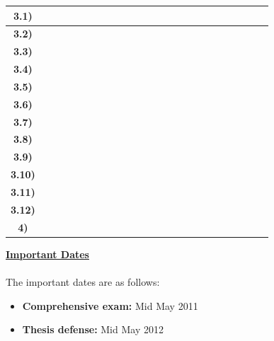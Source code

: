 \documentclass[a4,12pt]{report}
\newcommand{\X}{\cellcolor[gray]{0.5}}
\newcommand{\x}{\cellcolor[gray]{0.8}}
\begin{document}
\begin{table}[bt]
{\begin{tabular}{|c|c||c|c||c|c||c||c|c|c|c||c|c|c|c||c|}
\textbf{3.1)} & \X & ~ & ~ & ~ & ~ & ~ & ~ & ~ & ~ & ~ & ~ & ~ & ~ & ~ & \\ \hline
\textbf{3.2)} & \x & ~ & ~ & ~ & \X & ~ & ~ & ~ & ~ & ~ & ~ & ~ & ~ & ~ & \\ \hline
\textbf{3.3)} & \x & ~ & ~ & ~ & \X & ~ & ~ & ~ & ~ & ~ & ~ & ~ & ~ & ~ & \\ \hline
\textbf{3.4)} & \X & ~ & ~ & ~ & ~ & ~ & ~ & ~ & ~ & ~ & ~ & ~ & ~ & ~ & \\ \hline
\textbf{3.5)} & ~ & ~ & ~ & \X & \X & ~ & ~ & ~ & ~ & ~ & ~ & ~ & ~ & ~ & \\ \hline
\textbf{3.6)} & ~ & ~ & ~ & \X & \X & ~ & ~ & ~ & ~ & ~ & ~ & ~ & ~ & ~ & \\ \hline
\textbf{3.7)} & ~ & ~ & ~ & ~ & ~ & \X & \X & \X & ~ & ~ & ~ & ~ & ~ & ~ & \\ \hline
\textbf{3.8)} & ~ & ~ & ~ & ~ & ~ & ~ & ~ & \X & ~ & ~ & ~ & ~ & ~ & ~ & \\ \hline
\textbf{3.9)} & ~ & ~ & ~ & ~ & ~ & ~ & ~ & ~ & \X & \X & \X & ~ & ~ & ~ & \X \\ \hline
\textbf{3.10)} & ~ & ~ & ~ & ~ & ~ & ~ & ~ & ~ & ~ & ~ & \X & \X & ~ & ~ & \X \\ \hline
\textbf{3.11)} & ~ & ~ & ~ & ~ & ~ & ~ & ~ & ~ & ~ & ~ & ~ & ~ & \X & ~ & \\ \hline
\textbf{3.12)} & ~ & ~ & ~ & ~ & ~ & ~ & ~ & ~ & ~ & ~ & ~ & ~ & ~ & ~ & \X \\ \toprule[0.1em] \bottomrule[0.1em]
\textbf{4)} & ~ & ~ & ~ & ~ & ~ & ~ & ~ & ~ & ~ & ~ & ~ & ~ & ~ & \X &  \\ \hline
\end{tabular}
}
\normalsize
\label{t:timetable}
\end{table}

\large\underline{\textbf{Important Dates}}\\\\
\normalsize
The important dates are as follows:
\begin{itemize}
\item \textbf{Comprehensive exam:} Mid May 2011
\item\textbf{Thesis defense:} Mid May 2012
\end{itemize}


{\small }
\end{document}
